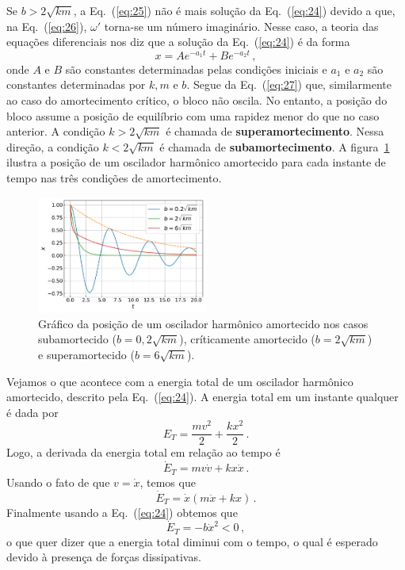 \documentclass[12pt,a4paper]{article}
\theoremstyle{definition}
\begin{document}
Se $b>2\sqrt{km}$, a Eq.~(\ref{eq:25}) não é mais solução da
Eq.~(\ref{eq:24}) devido a que, na Eq.~(\ref{eq:26}), $\omega'$
torna-se um número imaginário. Nesse caso, a teoria das equações
diferenciais nos diz que a solução da Eq.~(\ref{eq:24}) é da forma
\begin{equation}
  \label{eq:27}
  x=Ae^{-a_1t}+Be^{-a_2t}\,,
\end{equation}
onde $A$ e $B$ são constantes determinadas pelas condições iniciais e
$a_1$ e $a_2$ são constantes determinadas por $k,m$ e $b$. Segue da
Eq.~(\ref{eq:27}) que, similarmente ao caso do amortecimento crítico,
o bloco não oscila. No entanto, a posição do bloco assume a posição de
equilíbrio com uma rapidez menor do que no caso anterior. A condição
$k>2\sqrt{km}$ é chamada de \textbf{superamortecimento}. Nessa
direção, a condição $k<2\sqrt{km}$ é chamada de
\textbf{subamortecimento}. A figura~\ref{fig:osciladoramortecido}
ilustra a posição de um oscilador harmônico amortecido para cada
instante de tempo nas três condições de amortecimento.

\begin{figure}[ht]
  \centering
  \includegraphics[width=0.5\textwidth,keepaspectratio]{aux/osciladoramortecido.pdf}
  \caption{Gráfico da posição de um oscilador harmônico amortecido nos
    casos subamortecido ($b=0{,}2\sqrt{km}$), críticamente amortecido
    ($b=2\sqrt{km}$) e superamortecido ($b=6\sqrt{km}$).}
  \label{fig:osciladoramortecido}
\end{figure}

Vejamos o que acontece com a energia total de um oscilador harmônico
amortecido, descrito pela Eq.~(\ref{eq:24}). A energia total em um
instante qualquer é dada por
$$E_T=\frac{mv^2}{2}+\frac{kx^2}{2}\,.$$
Logo, a derivada da energia total em relação ao tempo é
$$\dot E_T=mv\dot v+kx\dot x\,.$$
Usando o fato de que $v=\dot x$, temos que
$$\dot E_T=\dot x(m\ddot x+kx)\,.$$
Finalmente usando a Eq.~(\ref{eq:24}) obtemos que
$$\dot E_T=-b\dot x^2<0\,,$$
o que quer dizer que a energia total diminui com o tempo, o qual é
esperado devido à presença de forças dissipativas.
\end{document}
